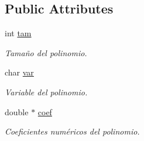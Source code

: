 \subsection*{Public Attributes}
\begin{DoxyCompactItemize}
\item 
int \hyperlink{class_polinomio_a4e1570a5d708ee593dd835fd886762f4}{tam}
\begin{DoxyCompactList}\small\item\em Tamaño del polinomio. \end{DoxyCompactList}\item 
char \hyperlink{class_polinomio_ac2471ef9aad80fb06f9ab99086d04af4}{var}
\begin{DoxyCompactList}\small\item\em Variable del polinomio. \end{DoxyCompactList}\item 
double $\ast$ \hyperlink{class_polinomio_a14c45ccfc7450fb0fed2e5e6f45afb54}{coef}
\begin{DoxyCompactList}\small\item\em Coeficientes numéricos del polinomio. \end{DoxyCompactList}\end{DoxyCompactItemize}


